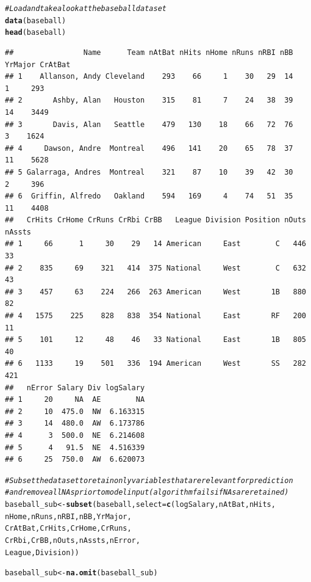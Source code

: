 \documentclass{article}\usepackage[]{graphicx}\usepackage[]{color}
\makeatletter
\newcommand{\hlcom}[1]{\textcolor[rgb]{0.678,0.584,0.686}{\textit{#1}}}%
\newcommand{\hlstd}[1]{\textcolor[rgb]{0.345,0.345,0.345}{#1}}%
\newcommand{\hlkwb}[1]{\textcolor[rgb]{0.69,0.353,0.396}{#1}}%
\newcommand{\hlkwc}[1]{\textcolor[rgb]{0.333,0.667,0.333}{#1}}%
\newcommand{\hlkwd}[1]{\textcolor[rgb]{0.737,0.353,0.396}{\textbf{#1}}}%
\newenvironment{kframe}{%
 \def\at@end@of@kframe{}%
 \ifinner\ifhmode%
  \def\at@end@of@kframe{\end{minipage}}%
  \begin{minipage}{\columnwidth}%
 \fi\fi%
 \def\FrameCommand##1{\hskip\@totalleftmargin \hskip-\fboxsep
 \colorbox{shadecolor}{##1}\hskip-\fboxsep
     \hskip-\linewidth \hskip-\@totalleftmargin \hskip\columnwidth}%
 \MakeFramed {\advance\hsize-\width
   \@totalleftmargin\z@ \linewidth\hsize
   \@setminipage}}%
 {\par\unskip\endMakeFramed%
 \at@end@of@kframe}
\newenvironment{knitrout}{}{} %
\makeatother
\begin{document}
\begin{knitrout}
\color{fgcolor}\begin{kframe}
\begin{alltt}
\hlcom{# Load and take a look at the baseball dataset}
\hlkwd{data}\hlstd{(baseball)}
\hlkwd{head}\hlstd{(baseball)}
\end{alltt}
\begin{verbatim}
##                Name      Team nAtBat nHits nHome nRuns nRBI nBB YrMajor CrAtBat
## 1    Allanson, Andy Cleveland    293    66     1    30   29  14       1     293
## 2       Ashby, Alan   Houston    315    81     7    24   38  39      14    3449
## 3       Davis, Alan   Seattle    479   130    18    66   72  76       3    1624
## 4     Dawson, Andre  Montreal    496   141    20    65   78  37      11    5628
## 5 Galarraga, Andres  Montreal    321    87    10    39   42  30       2     396
## 6  Griffin, Alfredo   Oakland    594   169     4    74   51  35      11    4408
##   CrHits CrHome CrRuns CrRbi CrBB   League Division Position nOuts nAssts
## 1     66      1     30    29   14 American     East        C   446     33
## 2    835     69    321   414  375 National     West        C   632     43
## 3    457     63    224   266  263 American     West       1B   880     82
## 4   1575    225    828   838  354 National     East       RF   200     11
## 5    101     12     48    46   33 National     East       1B   805     40
## 6   1133     19    501   336  194 American     West       SS   282    421
##   nError Salary Div logSalary
## 1     20     NA  AE        NA
## 2     10  475.0  NW  6.163315
## 3     14  480.0  AW  6.173786
## 4      3  500.0  NE  6.214608
## 5      4   91.5  NE  4.516339
## 6     25  750.0  AW  6.620073
\end{verbatim}
\begin{alltt}
\hlcom{# Subset the dataset to retain only variables that are relevant for prediction}
\hlcom{# and remove all NAs prior to model input (algorithm fails if NAs are retained)}
\hlstd{baseball_sub} \hlkwb{<-} \hlkwd{subset}\hlstd{(baseball,} \hlkwc{select} \hlstd{=} \hlkwd{c}\hlstd{(logSalary, nAtBat, nHits,}
                                            \hlstd{nHome, nRuns, nRBI, nBB, YrMajor,}
                                            \hlstd{CrAtBat, CrHits, CrHome, CrRuns,}
                                            \hlstd{CrRbi, CrBB, nOuts, nAssts, nError,}
                                            \hlstd{League, Division))}

\hlstd{baseball_sub} \hlkwb{<-} \hlkwd{na.omit}\hlstd{(baseball_sub)}


\end{alltt}
\end{kframe}
\end{knitrout}
\end{document}
